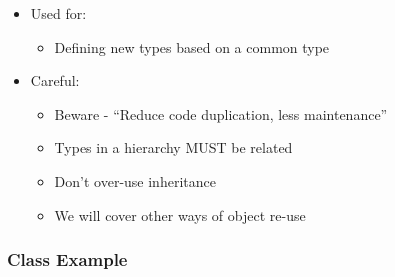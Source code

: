 \begin{itemize}
\itemsep1pt\parskip0pt
\item
  Used for:

  \begin{itemize}
  \itemsep1pt\parskip0pt
  \item
    Defining new types based on a common type
  \end{itemize}
\item
  Careful:

  \begin{itemize}
  \itemsep1pt\parskip0pt
  \item
    Beware - ``Reduce code duplication, less maintenance''
  \item
    Types in a hierarchy MUST be related
  \item
    Don't over-use inheritance
  \item
    We will cover other ways of object re-use
  \end{itemize}
\end{itemize}

\subsubsection{Class Example}\label{class-example-2}

